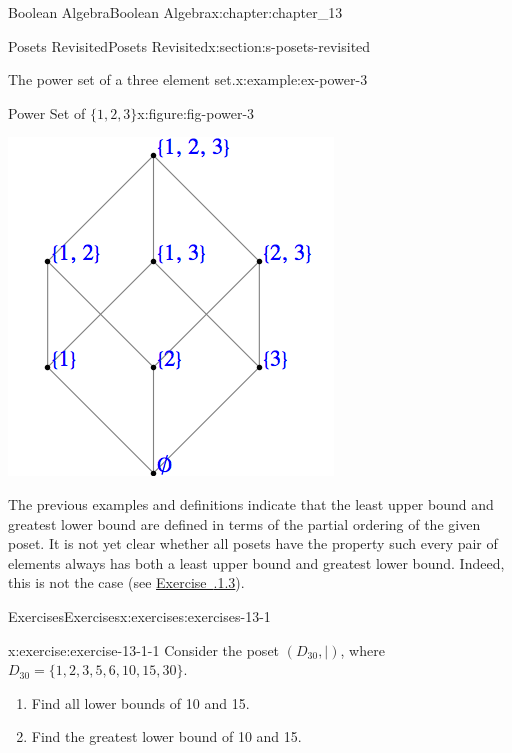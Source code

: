 \documentclass[oneside,10pt,]{book}
\newcommand{\xreffont}{\relax}
\numberwithin{equation}{section}
\begin{document}
\begin{chapterptx}{Boolean Algebra}{}{Boolean Algebra}{}{}{x:chapter:chapter_13}
\begin{sectionptx}{Posets Revisited}{}{Posets Revisited}{}{}{x:section:s-posets-revisited}
\begin{example}{The power set of a three element set.}{x:example:ex-power-3}
\begin{figureptx}{Power Set of \(\{1, 2, 3\}\)}{x:figure:fig-power-3}{}
\begin{image}{0.3}{0.4}{0.3}
\includegraphics[width=\linewidth]{images/fig-power-3.png}
\end{image}%
\tcblower
\end{figureptx}%
\end{example}
The previous examples and definitions indicate that the least upper bound and greatest lower bound  are defined in terms of the partial ordering of the given poset. It is not yet clear whether all posets have the property such every pair of elements always has both a least upper bound and greatest lower bound. Indeed, this is not the case (see \hyperlink{x:exercise:exercise-13-1-3}{Exercise~{\xreffont 13.1.1.3}}).%
%
%
\typeout{************************************************}
\typeout{************************************************}
%
\begin{exercises-subsection}{Exercises}{}{Exercises}{}{}{x:exercises:exercises-13-1}
\begin{divisionexercise}{1}{}{}{x:exercise:exercise-13-1-1}%
Consider the poset \((D_{30},\mid)\), where \(D_{30} = \{1,2, 3, 5, 6, 10, 15, 30\}\).%
\begin{enumerate}[label=(\alph*)]
\item{}Find all lower bounds of 10 and 15.%
\item{}Find the greatest lower bound  of 10 and 15.%

\end{enumerate}
\end{divisionexercise}
\end{exercises-subsection}
\end{sectionptx}
\end{chapterptx}
\end{document}
